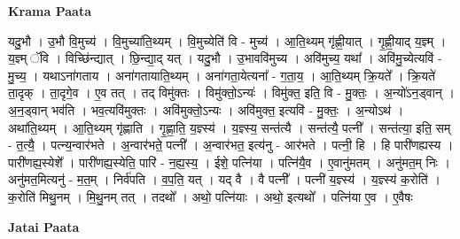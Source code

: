 \documentclass[17pt]{extarticle}
\begin{document}
\textbf{Krama Paata} \newline

यदु॒भौ । उ॒भौ वि॒मुच्य॑ । वि॒मुच्या॑ति॒थ्यम् । वि॒मुच्येति॑ वि - मुच्य॑ । आ॒ति॒थ्यम् गृ॑ह्णी॒यात् । गृ॒ह्णी॒याद् य॒ज्ञ्म् । य॒ज्ञ्म् ॅवि । विच्छि॑न्द्यात् । छि॒न्द्या॒द् यत् । यदु॒भौ । उ॒भाववि॑मुच्य । अवि॑मुच्य॒ यथा᳚ । अवि॑मु॒च्येत्यवि॑ - मु॒च्य॒ । यथाऽना॑गताय । अना॑गतायाति॒थ्यम् । अना॑गता॒येत्यना᳚ - ग॒ता॒य॒ । आ॒ति॒थ्यम् क्रि॒यते᳚ । क्रि॒यते॑ ता॒दृक् । ता॒दृगे॒व । ए॒व तत् । तद् विमु॑क्तः । विमु॑क्तो॒ऽन्यः॑ । विमु॑क्त॒ इति॒ वि - मु॒क्तः॒ । अ॒न्यो॑ऽन॒ड्वान् । अ॒न॒ड्वान् भव॑ति । भव॒त्यवि॑मुक्तः । अवि॑मुक्तो॒ऽन्यः । अवि॑मुक्त॒ इत्यवि॑ - मु॒क्तः॒ । अ॒न्योऽथ॑ । अथा॑ति॒थ्यम् । आ॒ति॒थ्यम् गृ॑ह्णाति । गृ॒ह्णा॒ति॒ य॒ज्ञ्स्य॑ । य॒ज्ञ्स्य॒ सन्त॑त्यै । सन्त॑त्यै॒ पत्नी᳚ । सन्त॑त्या॒ इति॒ सम् - त॒त्यै॒ । पत्न्य॒न्वार॑भते । अ॒न्वार॑भते॒ पत्नी᳚ । अ॒न्वार॑भत॒ इत्य॑नु - आर॑भते । पत्नी॒ हि । हि पारी॑णह्यस्य । पारी॑णह्य॒स्येशे᳚ । पारी॑णह्य॒स्येति॒ पारि॑ - न॒ह्य॒स्य॒ । ईशे॒ पत्नि॑या । पत्नि॑यै॒व । ए॒वानु॑मतम् । अनु॑मत॒म् निः । अनु॑मत॒मित्यनु॑ - म॒त॒म् । निर्व॑पति । व॒प॒ति॒ यत् । यद् वै । वै पत्नी᳚ । पत्नी॑ य॒ज्ञ्स्य॑ । य॒ज्ञ्स्य॑ क॒रोति॑ । क॒रोति॑ मिथु॒नम् । मि॒थु॒नम् तत् । तदथो᳚ । अथो॒ पत्नि॑याः । अथो॒ इत्यथो᳚ । पत्नि॑या ए॒व । ए॒वैषः \newline

\textbf{Jatai Paata} \newline
\end{document}
